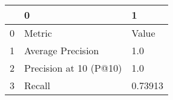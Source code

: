 \begin{tabular}{lll}
\toprule
{} &                       0 &        1 \\
\midrule
0 &                  Metric &    Value \\
1 &       Average Precision &      1.0 \\
2 &  Precision at 10 (P@10) &      1.0 \\
3 &                  Recall &  0.73913 \\
\bottomrule
\end{tabular}

